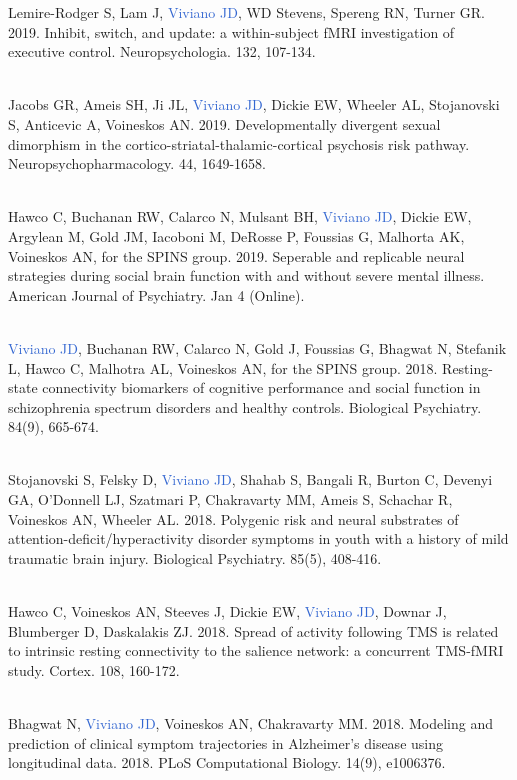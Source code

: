 \documentclass[a4paper,11pt,oneside]{book}
\begin{document}
\begin{flushleft}
Lemire-Rodger S, Lam J, \textcolor{highlight}{Viviano JD}, WD Stevens, Spereng RN, Turner GR. 2019. Inhibit, switch, and update: a within-subject fMRI investigation of executive control. Neuropsychologia. 132, 107-134. \\\

Jacobs GR, Ameis SH, Ji JL, \textcolor{highlight}{Viviano JD}, Dickie EW, Wheeler AL, Stojanovski S, Anticevic A, Voineskos AN. 2019. Developmentally divergent sexual dimorphism in the cortico-striatal-thalamic-cortical psychosis risk pathway. Neuropsychopharmacology. 44, 1649-1658. \\\

Hawco C, Buchanan RW, Calarco N, Mulsant BH, \textcolor{highlight}{Viviano JD}, Dickie EW, Argylean M, Gold JM, Iacoboni M, DeRosse P, Foussias G, Malhorta AK, Voineskos AN, for the SPINS group. 2019. Seperable and replicable neural strategies during social brain function with and without severe mental illness. American Journal of Psychiatry. Jan 4 (Online). \\\

\textcolor{highlight}{Viviano JD}, Buchanan RW, Calarco N, Gold J, Foussias G, Bhagwat N, Stefanik L, Hawco C, Malhotra AL, Voineskos AN, for the SPINS group. 2018. Resting-state connectivity biomarkers of cognitive performance and social function in schizophrenia spectrum disorders and healthy controls. Biological Psychiatry. 84(9), 665-674.  \\\

Stojanovski S, Felsky D, \textcolor{highlight}{Viviano JD}, Shahab S, Bangali R, Burton C, Devenyi GA, O'Donnell LJ, Szatmari P, Chakravarty MM, Ameis S, Schachar R, Voineskos AN, Wheeler AL. 2018. Polygenic risk and neural substrates of attention-deficit/hyperactivity disorder symptoms in youth with a history of mild traumatic brain injury. Biological Psychiatry. 85(5), 408-416. \\\

Hawco C, Voineskos AN,  Steeves J, Dickie EW, \textcolor{highlight}{Viviano JD}, Downar J, Blumberger D, Daskalakis ZJ. 2018. Spread of activity following TMS is related to intrinsic resting connectivity to the salience network: a concurrent TMS-fMRI study. Cortex. 108, 160-172. \\\

Bhagwat N, \textcolor{highlight}{Viviano JD}, Voineskos AN, Chakravarty MM. 2018. Modeling and prediction of clinical symptom trajectories in Alzheimer's disease using longitudinal data. 2018. PLoS Computational Biology. 14(9), e1006376. \\\


\end{flushleft}
\end{document}
